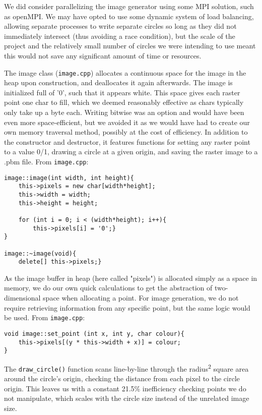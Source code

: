 \documentclass{article}
\begin{document}
	We did consider parallelizing the image generator using some MPI solution, such as openMPI. We may have opted to use some dynamic system of load balancing, allowing separate processes to write separate circles so long as they did not immediately intersect (thus avoiding a race condition), but the scale of the project and the relatively small number of circles we were intending to use meant this would not save any significant amount of time or resources.
		
	The image class (\texttt{image.cpp}) allocates a continuous space for the image in the heap upon construction, and deallocates it again afterwards. The image is initialized full of '0', such that it appears white.
	This space gives each raster point one char to fill, which we deemed reasonably effective as chars typically only take up a byte each.
	Writing bitwise was an option and would have been even more space-efficient, but we avoided it as we would have had to create our own memory traversal method, possibly at the cost of efficiency.
	In addition to the constructor and destructor, it features functions for setting any raster point to a value 0/1, drawing a circle at a given origin, and saving the raster image to a .pbm file. From \texttt{image.cpp}:
	
	\begin{lstlisting}
image::image(int width, int height){
	this->pixels = new char[width*height];
	this->width = width;
	this->height = height;
				
	for (int i = 0; i < (width*height); i++){
		this->pixels[i] = '0';}
}

image::~image(void){
	delete[] this->pixels;}
	\end{lstlisting}

	As the image buffer in heap (here called "pixels") is allocated simply as a space in memory, we do our own quick calculations to get the abstraction of two-dimensional space when allocating a point. For image generation, we do not require retrieving information from any specific point, but the same logic would be used. From \texttt{image.cpp}:
	\begin{lstlisting}
void image::set_point (int x, int y, char colour){
	this->pixels[(y * this->width + x)] = colour;
}
	\end{lstlisting}
	
	The \texttt{draw\_circle()} function scans line-by-line through the radius\textsuperscript{2} square area around the circle's origin, checking the distance from each pixel to the circle origin. This leaves us with a constant 21.5\% inefficiency checking points we do not manipulate, which scales with the circle size instead of the unrelated image size.
		
\end{document}
